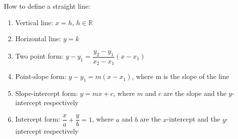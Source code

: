 \begin{mysubsection}{}
    How to define a straight line:

    \begin{enumerate}
        \item Vertical line: $x=h$, $h\in \mathbb{R}$
        \item Horizontal line: $y=k$
        \item Two point form: $y-y_1=\dfrac{y_2-y_1}{x_2-x_1}(x-x_1)$
        \item Point-slope form: $y-y_1=m(x-x_1)$, where m is the slope of the line
        \item Slope-intercept form: $y=mx+c$, where $m$ and $c$ are the slope and the $y$-intercept respectively
        \item Intercept form: $\dfrac{x}{a}+\dfrac{y}{b}=1$, where $a$ and $b$ are the $x$-intercept and the $y$-intercept respectively
    \end{enumerate}
\end{mysubsection}

